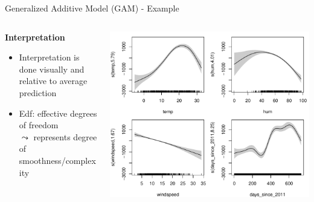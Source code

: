 \documentclass[10pt,compress,t,notes=noshow, xcolor=table]{beamer}
\begin{document}
\begin{frame}{Generalized Additive Model (GAM) - Example}
\begin{columns}[T, totalwidth=\textwidth]
\begin{column}{0.5\textwidth}
\textbf{Interpretation}
\begin{itemize}
    \item Interpretation is done visually and relative to average prediction
    \item Edf: effective degrees of freedom\\
    $\leadsto$ represents degree of smoothness/complexity
\end{itemize}
\end{column}
\hfill
\centering
\begin{column}{0.5\textwidth}
\includegraphics[width = \textwidth]{figure/gam_effects.pdf}
\end{column}
\end{columns}
\end{frame}

\end{document}
